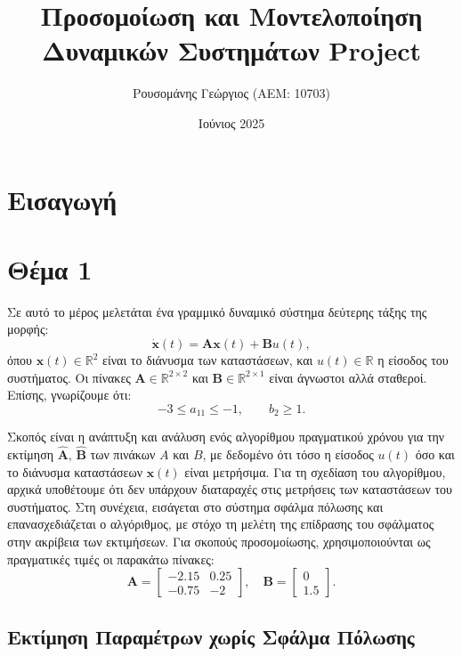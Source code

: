 \documentclass[a4paper,12pt]{article}
\title{Προσομοίωση και Μοντελοποίηση \newline Δυναμικών Συστημάτων \newline 
\selectlanguage{english}Project\selectlanguage{greek}}
\author{Ρουσομάνης Γεώργιος (ΑΕΜ: 10703)}
\date{Ιούνιος 2025}
\begin{document}
\maketitle

\section*{Εισαγωγή}

\section*{Θέμα 1}

Σε αυτό το μέρος μελετάται ένα γραμμικό δυναμικό σύστημα δεύτερης τάξης της μορφής:
\begin{equation}
\dot{\mathbf{x}}(t) = \mathbf{A} \mathbf{x}(t) + \mathbf{B} u(t),
\end{equation}
όπου $\mathbf{x}(t) \in \mathbb{R}^2$ είναι το διάνυσμα των καταστάσεων, και $u(t) \in \mathbb{R}$ 
η είσοδος του συστήματος. Οι πίνακες $\mathbf{A} \in \mathbb{R}^{2 \times 2}$ και 
$\mathbf{B} \in \mathbb{R}^{2 \times 1}$ είναι άγνωστοι αλλά σταθεροί. Επίσης, γνωρίζουμε ότι:
\begin{equation}
-3 \leq a_{11} \leq -1, \quad \quad b_2 \geq 1.
\label{eq:restrictions}
\end{equation}

Σκοπός είναι η ανάπτυξη και ανάλυση ενός αλγορίθμου πραγματικού χρόνου για την εκτίμηση  
$\hat{\mathbf{A}},\,\hat{\mathbf{B}}$ των πινάκων $A$ και $B$, με δεδομένο ότι τόσο η είσοδος 
$u(t)$ όσο και το διάνυσμα καταστάσεων $\mathbf{x}(t)$ είναι μετρήσιμα. Για τη σχεδίαση του 
αλγορίθμου, αρχικά υποθέτουμε ότι δεν υπάρχουν διαταραχές στις μετρήσεις των καταστάσεων του 
συστήματος. Στη συνέχεια, εισάγεται στο σύστημα σφάλμα πόλωσης και επανασχεδιάζεται ο αλγόριθμος, 
με στόχο τη μελέτη της επίδρασης του σφάλματος στην ακρίβεια των εκτιμήσεων. Για σκοπούς 
προσομοίωσης, χρησιμοποιούνται ως πραγματικές τιμές οι παρακάτω πίνακες:
\[
\mathbf{A} = 
\begin{bmatrix}
-2.15 & 0.25 \\
-0.75 & -2
\end{bmatrix}, \quad
\mathbf{B} = 
\begin{bmatrix}
0 \\
1.5
\end{bmatrix}.
\]

\subsection*{Εκτίμηση Παραμέτρων χωρίς Σφάλμα Πόλωσης}
\end{document}
